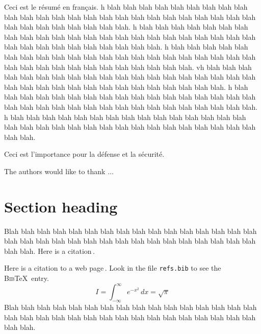 \documentclass[rd,pdfa]{drdc-report}
\begin{document}
\begin{fabstract}
  Ceci est le r\'esum\'e en fran\c{c}ais.
  h blah blah blah blah blah blah blah blah blah blah blah blah blah
blah blah blah blah blah blah blah blah blah blah blah blah blah blah
blah blah blah blah blah blah. 
h blah blah blah blah blah blah blah blah blah blah blah blah blah
blah blah blah blah blah blah blah blah blah blah blah blah blah blah
blah blah blah blah blah blah. 
h blah blah blah blah blah blah blah blah blah blah blah blah blah
blah blah blah blah blah blah blah blah blah blah blah blah blah blah
blah blah blah blah blah blah. vh blah blah blah blah blah blah blah blah blah blah blah blah blah
blah blah blah blah blah blah blah blah blah blah blah blah blah blah
blah blah blah blah blah blah. 
h blah blah blah blah blah blah blah blah blah blah blah blah blah
blah blah blah blah blah blah blah blah blah blah blah blah blah blah
blah blah blah blah blah blah. 
h blah blah blah blah blah blah blah blah blah blah blah blah blah
blah blah blah blah blah blah blah blah blah blah blah blah blah blah
blah blah blah blah blah blah. 
\end{fabstract}

\begin{fsignificance}
  Ceci est l'importance pour la d\'efense et la s\'ecurit\'e.
\end{fsignificance}

\tableofcontents\clearpage
\listoffigures\clearpage
\listoftables
\begin{acknowledgements}
The authors would like to thank $\ldots$
\end{acknowledgements}
\let\cleardoublepage\clearpage
\section{Section heading}

Blah blah blah blah blah blah blah blah blah blah blah blah blah blah
blah blah blah blah blah blah blah blah blah blah blah blah blah blah
blah blah blah blah blah blah.  Here is a citation\,\cite{EXAMPLE}.

Here is a citation to a web page\,\cite{MAPLE}.  Look in the file
\texttt{refs.bib} to see the \textsc{Bib}\TeX\ entry.
%
\begin{equation}
 I = \int_{-\infty}^\infty e^{-x^2}\,dx = \sqrt{\pi}
\end{equation}
%
Blah blah blah blah blah blah blah blah blah blah blah blah blah blah
blah blah blah blah blah blah blah blah blah blah blah blah blah blah
blah blah blah blah blah blah.
\end{document}
